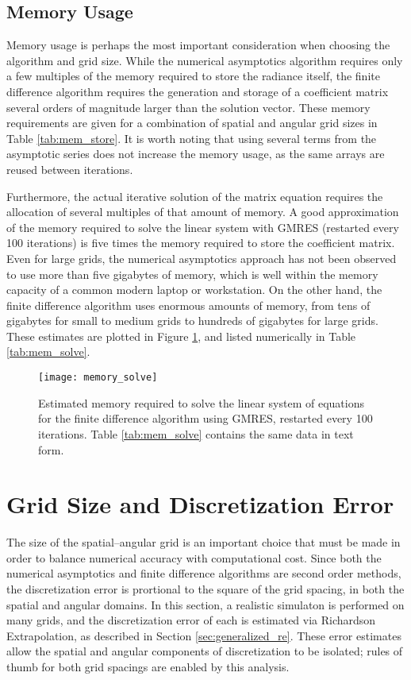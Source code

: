 \subsection{Memory Usage}
Memory usage is perhaps the most important consideration when choosing the algorithm and grid size.
While the numerical asymptotics algorithm requires only a few multiples of the memory required to store the radiance itself, the finite difference algorithm requires the generation and storage of a coefficient matrix several orders of magnitude larger than the solution vector.
These memory requirements are given for a combination of spatial and angular grid sizes in Table \ref{tab:mem_store}.
It is worth noting that using several terms from the asymptotic series does not increase the memory usage, as the same arrays are reused between iterations.

Furthermore, the actual iterative solution of the matrix equation requires the allocation of several multiples of that amount of memory.
A good approximation of the memory required to solve the linear system with GMRES (restarted every 100 iterations) is five times the memory required to store the coefficient matrix.
Even for large grids, the numerical asymptotics approach has not been observed to use more than five gigabytes of memory, which is well within the memory capacity of a common modern laptop or workstation.
On the other hand, the finite difference algorithm uses enormous amounts of memory, from tens of gigabytes for small to medium grids to hundreds of gigabytes for large grids.
These estimates are plotted in Figure \ref{fig:mem_solve}, and listed numerically in Table \ref{tab:mem_solve}.
\begin{figure}[H]
  \centering
  \texttt{[image: memory\_solve]}
  \caption{Estimated memory required to solve the linear system of equations for the finite difference algorithm using GMRES, restarted every 100 iterations. Table \ref{tab:mem_solve} contains the same data in text form.}
  \label{fig:mem_solve}
\end{figure}

\section{Grid Size and Discretization Error}
\label{sec:grid_size}
The size of the spatial--angular grid is an important choice that must be made in order to balance numerical accuracy with computational cost.
Since both the numerical asymptotics and finite difference algorithms are second order methods, the discretization error is prortional to the square of the grid spacing, in both the spatial and angular domains.
In this section, a realistic simulaton is performed on many grids, and the discretization error of each is estimated via Richardson Extrapolation, as described in Section \ref{sec:generalized_re}.
These error estimates allow the spatial and angular components of discretization to be isolated; rules of thumb for both grid spacings are enabled by this analysis.

